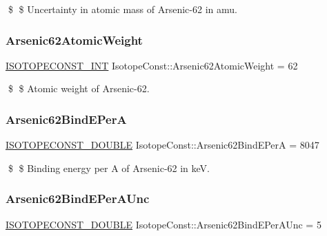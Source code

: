 \$ \$ Uncertainty in atomic mass of Arsenic-\/62 in amu. \mbox{\label{group___isotope_const-_arsenic-_as62_ga736885f50b32c3083297dd0e92371a53}} 
\subsubsection{\texorpdfstring{Arsenic62\+Atomic\+Weight}{Arsenic62AtomicWeight}}
{\footnotesize\ttfamily \mbox{\hyperlink{group___isotope_const-_macros_ga5f18360b3e99483a35c32d789e62621c}{I\+S\+O\+T\+O\+P\+E\+C\+O\+N\+S\+T\+\_\+\+I\+NT}} Isotope\+Const\+::\+Arsenic62\+Atomic\+Weight = 62}

\$ \$ Atomic weight of Arsenic-\/62. \mbox{\label{group___isotope_const-_arsenic-_as62_ga9201511c1f6032752bd8579081a31a04}} 
\subsubsection{\texorpdfstring{Arsenic62\+Bind\+E\+PerA}{Arsenic62BindEPerA}}
{\footnotesize\ttfamily \mbox{\hyperlink{group___isotope_const-_macros_ga8f45a7272ce02c0b4c65c44636ed719a}{I\+S\+O\+T\+O\+P\+E\+C\+O\+N\+S\+T\+\_\+\+D\+O\+U\+B\+LE}} Isotope\+Const\+::\+Arsenic62\+Bind\+E\+PerA = 8047}

\$ \$ Binding energy per A of Arsenic-\/62 in keV. \mbox{\label{group___isotope_const-_arsenic-_as62_gaf7b6f58632b3b7f95321554ef40762a7}} 
\subsubsection{\texorpdfstring{Arsenic62\+Bind\+E\+Per\+A\+Unc}{Arsenic62BindEPerAUnc}}
{\footnotesize\ttfamily \mbox{\hyperlink{group___isotope_const-_macros_ga8f45a7272ce02c0b4c65c44636ed719a}{I\+S\+O\+T\+O\+P\+E\+C\+O\+N\+S\+T\+\_\+\+D\+O\+U\+B\+LE}} Isotope\+Const\+::\+Arsenic62\+Bind\+E\+Per\+A\+Unc = 5}

